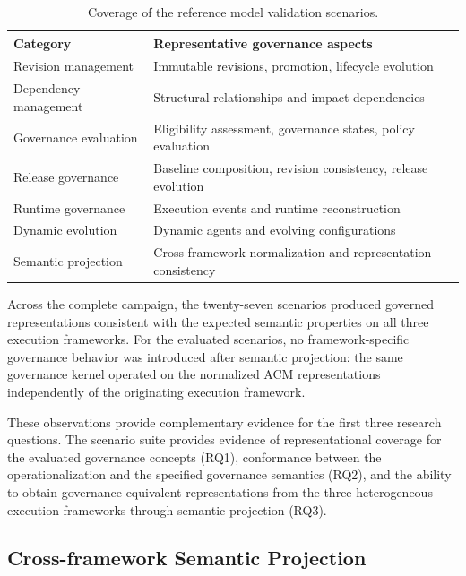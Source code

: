 \documentclass[10pt]{article}
\begin{document}
\begin{table}[t]
	\centering
	\caption{Coverage of the reference model validation scenarios.}
	\label{tab:scenario_categories}
	\small
	\begin{tabular}{p{3.2cm}p{3.8cm}}
		\toprule
		\textbf{Category} & \textbf{Representative governance aspects} \\
		\midrule
		Revision management &
		Immutable revisions, promotion, lifecycle evolution \\
		Dependency management &
		Structural relationships and impact dependencies \\
		Governance evaluation &
		Eligibility assessment, governance states, policy evaluation \\
		Release governance &
		Baseline composition, revision consistency, release evolution \\
		Runtime governance &
		Execution events and runtime reconstruction \\
		Dynamic evolution &
		Dynamic agents and evolving configurations \\
		Semantic projection &
		Cross-framework normalization and representation consistency \\
		\bottomrule
	\end{tabular}
\end{table}

Across the complete campaign, the twenty-seven scenarios produced governed representations consistent with the expected semantic properties on all three execution frameworks. For the evaluated scenarios, no framework-specific governance behavior was introduced after semantic projection: the same governance kernel operated on the normalized ACM representations independently of the originating execution framework.

These observations provide complementary evidence for the first three research questions. The scenario suite provides evidence of representational coverage for the evaluated governance concepts (RQ1), conformance between the operationalization and the specified governance semantics (RQ2), and the ability to obtain governance-equivalent representations from the three heterogeneous execution frameworks through semantic projection (RQ3).

\subsection{Cross-framework Semantic Projection}
\label{sec:cross_framework_projection}
\end{document}
